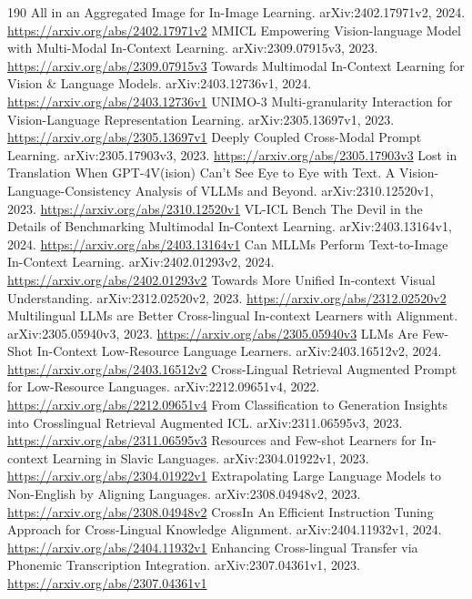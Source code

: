 \documentclass[11pt]{article}
\begin{document}
\begin{thebibliography}{190}
 All in an Aggregated Image for In-Image Learning. arXiv:2402.17971v2, 2024. \url{https://arxiv.org/abs/2402.17971v2}
 MMICL Empowering Vision-language Model with Multi-Modal In-Context Learning. arXiv:2309.07915v3, 2023. \url{https://arxiv.org/abs/2309.07915v3}
 Towards Multimodal In-Context Learning for Vision \& Language Models. arXiv:2403.12736v1, 2024. \url{https://arxiv.org/abs/2403.12736v1}
 UNIMO-3 Multi-granularity Interaction for Vision-Language Representation Learning. arXiv:2305.13697v1, 2023. \url{https://arxiv.org/abs/2305.13697v1}
 Deeply Coupled Cross-Modal Prompt Learning. arXiv:2305.17903v3, 2023. \url{https://arxiv.org/abs/2305.17903v3}
 Lost in Translation When GPT-4V(ision) Can't See Eye to Eye with Text. A Vision-Language-Consistency Analysis of VLLMs and Beyond. arXiv:2310.12520v1, 2023. \url{https://arxiv.org/abs/2310.12520v1}
 VL-ICL Bench The Devil in the Details of Benchmarking Multimodal In-Context Learning. arXiv:2403.13164v1, 2024. \url{https://arxiv.org/abs/2403.13164v1}
 Can MLLMs Perform Text-to-Image In-Context Learning. arXiv:2402.01293v2, 2024. \url{https://arxiv.org/abs/2402.01293v2}
 Towards More Unified In-context Visual Understanding. arXiv:2312.02520v2, 2023. \url{https://arxiv.org/abs/2312.02520v2}
 Multilingual LLMs are Better Cross-lingual In-context Learners with Alignment. arXiv:2305.05940v3, 2023. \url{https://arxiv.org/abs/2305.05940v3}
 LLMs Are Few-Shot In-Context Low-Resource Language Learners. arXiv:2403.16512v2, 2024. \url{https://arxiv.org/abs/2403.16512v2}
 Cross-Lingual Retrieval Augmented Prompt for Low-Resource Languages. arXiv:2212.09651v4, 2022. \url{https://arxiv.org/abs/2212.09651v4}
 From Classification to Generation Insights into Crosslingual Retrieval Augmented ICL. arXiv:2311.06595v3, 2023. \url{https://arxiv.org/abs/2311.06595v3}
 Resources and Few-shot Learners for In-context Learning in Slavic Languages. arXiv:2304.01922v1, 2023. \url{https://arxiv.org/abs/2304.01922v1}
 Extrapolating Large Language Models to Non-English by Aligning Languages. arXiv:2308.04948v2, 2023. \url{https://arxiv.org/abs/2308.04948v2}
 CrossIn An Efficient Instruction Tuning Approach for Cross-Lingual Knowledge Alignment. arXiv:2404.11932v1, 2024. \url{https://arxiv.org/abs/2404.11932v1}
 Enhancing Cross-lingual Transfer via Phonemic Transcription Integration. arXiv:2307.04361v1, 2023. \url{https://arxiv.org/abs/2307.04361v1}

\end{thebibliography}
\end{document}
